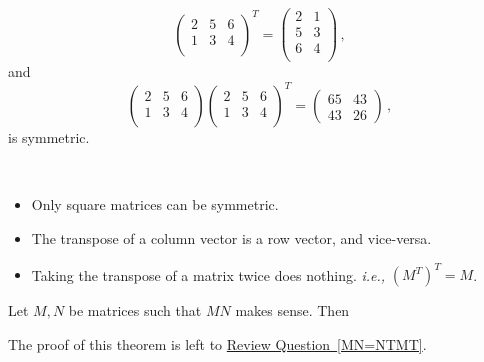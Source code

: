 \begin{example}
\[\begin{pmatrix}
2 & 5 & 6\\
1 & 3 & 4\\
\end{pmatrix}^T = 
\begin{pmatrix}
2 & 1 \\
5 & 3 \\
6 & 4 \\
\end{pmatrix}\, ,\]
and
\[
\begin{pmatrix}
2 & 5 & 6\\
1 & 3 & 4\\
\end{pmatrix}
\begin{pmatrix}
2 & 5 & 6\\
1 & 3 & 4\\
\end{pmatrix}^T = 
\begin{pmatrix}
65&43\\43&26
\end{pmatrix}\, ,\]
is symmetric.


\end{example}


\begin{remark}[Observations]

$\phantom{test}$

\begin{itemize}
\item Only square matrices can be symmetric.

\item The transpose of a column vector is a row vector, and vice-versa. 

\item Taking the transpose of a matrix twice does nothing.  \emph{i.e.,} $(M^T)^T=M$.
\end{itemize}
\end{remark}

\begin{theorem}
Let $M, N$ be matrices such that $MN$ makes sense.  Then 
\end{theorem}
The proof of this theorem is left to \hyperref[MN=NTMT]{Review Question~\ref*{MN=NTMT}}.

